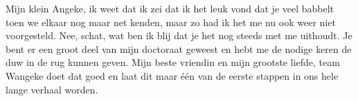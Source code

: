 \noindent Mijn klein Angeke, ik weet dat ik zei dat ik het leuk vond dat je veel babbelt toen we elkaar nog maar net kenden, maar zo had ik het me nu ook weer niet voorgesteld. Nee, schat, wat ben ik blij dat je het nog steeds met me uithoudt. Je bent er een groot deel van mijn doctoraat geweest en hebt me de nodige keren de duw in de rug kunnen geven. Mijn beste vriendin en mijn grootste liefde, team Wangeke doet dat goed en laat dit maar \'e\'en van de eerste stappen in ons hele lange verhaal worden.
\fi

~\vfill

\newpage
